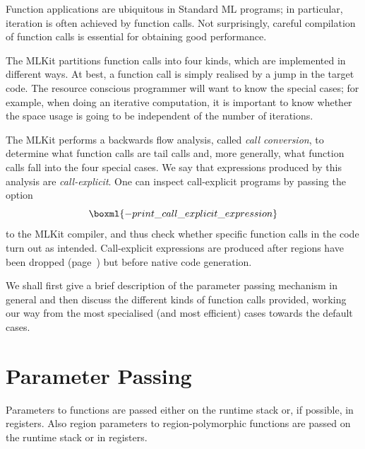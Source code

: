 \documentclass[12pt]{book}
\begin{document}
Function applications are ubiquitous in Standard ML programs; in
particular, iteration is often achieved by function calls. Not
surprisingly, careful compilation of function calls is essential for
obtaining good performance.

The MLKit partitions function calls into four kinds, which are
implemented in different ways.  At best, a function call is simply
realised by a jump in the target code.  The resource conscious
programmer will want to know the special cases; for example, when
doing an iterative computation, it is important to know whether the
space usage is going to be independent of the number of iterations.

The MLKit performs a backwards flow analysis, called
%
{\em call conversion}, to determine what function calls are tail calls
and, more generally, what function calls fall into the four special
cases. We say that expressions produced by this analysis are
%
\label{call-explicit}%
{\em call-explicit}. One can inspect call-explicit programs by
passing the option
%
$$\boxml{-print\_call\_explicit\_expression}$$
to the MLKit compiler,
and thus check whether specific function calls in the code turn out as
intended.  Call-explicit expressions are produced after regions have
been dropped (page~\pageref{bother-to-distinguish-get-n-put}) but
before native code generation.

We shall first give a brief description of the parameter passing
mechanism in general and then discuss the different kinds of function
calls provided, working our way from the most specialised (and most
efficient) cases towards the default cases.

\section{Parameter Passing}
Parameters to functions are passed either on the runtime
%
stack or, if possible, in
%
registers. Also region parameters to region-polymorphic functions are
passed on the runtime stack or in registers.
\end{document}
